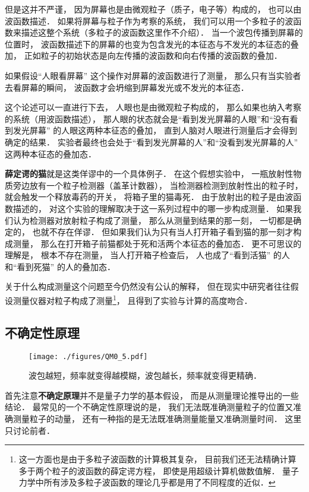 但是这并不严谨， 因为屏幕也是由微观粒子（质子，电子等）构成的， 也可以由波函数描述． 如果将屏幕与粒子作为考察的系统， 我们可以用一个多粒子的波函数来描述这整个系统（多粒子的波函数这里作不介绍）． 当一个波包传播到屏幕的位置时， 波函数描述下的屏幕的也变为包含发光的本征态与不发光的本征态的叠加， 正如粒子的初始状态是向左传播的波函数和向右传播的波函数的叠加． 

如果假设“人眼看屏幕” 这个操作对屏幕的波函数进行了测量， 那么只有当实验者去看屏幕的瞬间， 波函数才会坍缩到屏幕发光或不发光的本征态．

这个论述可以一直进行下去， 人眼也是由微观粒子构成的， 那么如果也纳入考察的系统（用波函数描述）， 那人眼的状态就会是“看到发光屏幕的人眼”和“没有看到发光屏幕” 的人眼这两种本征态的叠加， 直到人脑对人眼进行测量后才会得到确定的结果． 实验者最终也会处于“看到发光屏幕的人”和“没看到发光屏幕的人” 这两种本征态的叠加态．

\textbf{薛定谔的猫}就是这类佯谬中的一个具体例子． 在这个假想实验中， 一瓶放射性物质旁边放有一个粒子检测器（盖革计数器）， 当检测器检测到放射性出的粒子时， 就会触发一个释放毒药的开关， 将箱子里的猫毒死． 由于放射出的粒子是由波函数描述的， 对这个实验的理解取决于这一系列过程中的哪一步构成测量． 如果我们认为检测器对放射粒子构成了测量， 那么从测量到结果的那一刻， 一切都是确定的， 也就不存在佯谬． 但如果我们认为只有当人打开箱子看到猫的那一刻才构成测量， 那么在打开箱子前猫都处于死和活两个本征态的叠加态． 更不可思议的理解是， 根本不存在测量， 当人打开箱子检查后， 人也成了“看到活猫” 的人和“看到死猫” 的人的叠加态．

关于什么构成测量这个问题至今仍然没有公认的解释， 但在现实中研究者往往假设测量仪器对粒子构成了测量\footnote{这一方面也是由于多粒子波函数的计算极其复杂， 目前我们还无法精确计算多于两个粒子的波函数的薛定谔方程， 即使是用超级计算机做数值解． 量子力学中所有涉及多粒子波函数的理论几乎都是用了不同程度的近似．}， 且得到了实验与计算的高度吻合．

\subsection{不确定性原理}

\begin{figure}[ht]
\centering
\texttt{[image: ./figures/QM0\_5.pdf]}
\caption{波包越短，频率就变得越模糊，波包越长，频率就变得更精确．} \label{QM0_fig5}
\end{figure}

首先注意\textbf{不确定原理}并不是量子力学的基本假设， 而是从测量理论推导出的一些结论． 最常见的一个不确定性原理说的是， 我们无法既准确测量粒子的位置又准确测量粒子的动量， 还有一种指的是无法既准确测量能量又准确测量时间． 这里只讨论前者．

